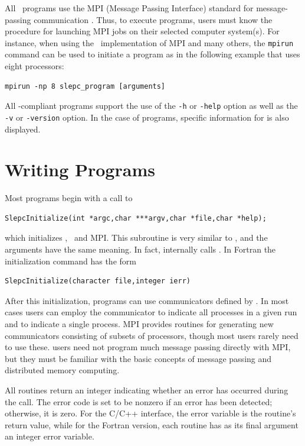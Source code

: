 All \petsc\ programs use the MPI (Message Passing Interface) standard
for message-passing communication \citep{MPI-Forum:1994:MMI}.  Thus, to execute
\slepc programs, users must know the procedure for launching MPI jobs
on their selected computer system(s).  For instance, when using the
\mpich\ implementation of MPI and many others, the \texttt{mpirun} command can be used to initiate a program as in the following example that uses eight processors:
	\begin{Verbatim}[fontsize=\small]
	mpirun -np 8 slepc_program [arguments]
	\end{Verbatim}

All \petsc-compliant programs support the use of the \Verb!-h!
or \Verb!-help! option as well as the \Verb!-v! or \Verb!-version! option. In the case of \slepc programs, specific information for \slepc is also displayed.

\section{Writing \slepc Programs}

Most \slepc programs begin with a call to 
	\begin{Verbatim}[fontsize=\small]
	SlepcInitialize(int *argc,char ***argv,char *file,char *help);
	\end{Verbatim}
which initializes \slepc, \petsc\ and MPI. This subroutine is very similar to , and the arguments have the same meaning. In fact, internally  calls .
In Fortran the initialization command has the form
	\begin{Verbatim}[fontsize=\small]
	SlepcInitialize(character file,integer ierr)
	\end{Verbatim}

After this initialization, \slepc programs can use communicators defined by \petsc. In most cases users can employ the communicator  to indicate all processes in a given run and  to indicate a single process. MPI provides routines for generating new communicators consisting of subsets of processors, though most users rarely need to use these. \slepc users need not program much message passing directly
with MPI, but they must be familiar with the basic concepts of message
passing and distributed memory computing.

All \slepc routines return an integer indicating whether an error has
occurred during the call.  The error code is set to be nonzero if an
error has been detected; otherwise, it is zero.  For the C/C++
interface, the error variable is the routine's return value, while for
the Fortran version, each \slepc routine has as its final argument an
integer error variable. 


